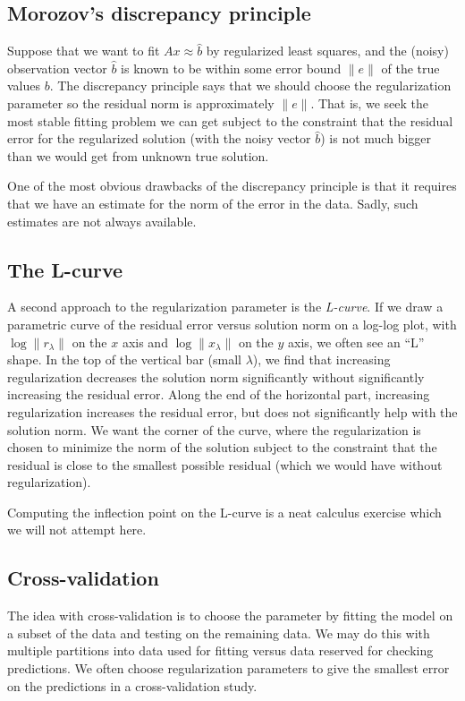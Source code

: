 \documentclass[12pt, leqno]{article} %
\begin{document}
\subsection{Morozov's discrepancy principle}

Suppose that we want to fit $Ax \approx \hat{b}$ by regularized least
squares, and the (noisy) observation vector $\hat{b}$ is known to be
within some error bound $\|e\|$ of the true values $b$. The discrepancy
principle says that we should choose the regularization parameter so the
residual norm is approximately $\|e\|$. That is, we seek the most stable
fitting problem we can get subject to the constraint that the residual
error for the regularized solution (with the noisy vector $\hat{b}$) is
not much bigger than we would get from unknown true solution.

One of the most obvious drawbacks of the discrepancy principle is that
it requires that we have an estimate for the norm of the error in the
data.  Sadly, such estimates are not always available.

\subsection{The L-curve}

A second approach to the regularization parameter is the {\em L-curve}.
If we draw a parametric curve of the residual error versus solution norm
on a log-log plot, with $\log \|r_{\lambda}\|$ on the $x$ axis
and $\log \|x_{\lambda}\|$ on the $y$ axis, we often see an ``L'' shape.
In the top of the vertical bar (small $\lambda$), we find that increasing
regularization decreases the solution norm significantly without significantly
increasing the residual error.  Along the end of the horizontal part,
increasing regularization increases the residual error, but does not
significantly help with the solution norm.  We want the corner of the
curve, where the regularization is chosen to minimize the norm of the
solution subject to the constraint that the residual is close to the
smallest possible residual (which we would have without regularization).

Computing the inflection point on the L-curve is a neat calculus
exercise which we will not attempt here.

\subsection{Cross-validation}

The idea with cross-validation is to choose the parameter
by fitting the model on a subset of the data and testing on the remaining
data.  We may do this with multiple partitions into data used for fitting
versus data reserved for checking predictions.
We often choose regularization parameters to give the smallest error on
the predictions in a cross-validation study.
\end{document}
